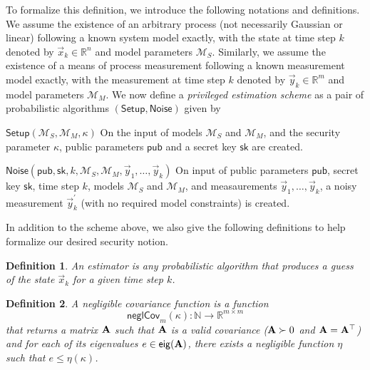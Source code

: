 \documentclass[letterpaper, 10 pt, conference]{ieeeconf}
\newtheorem{definition}{Definition}[section]
\begin{document}
To formalize this definition, we introduce the following notations and definitions. We assume the existence of an arbitrary process (not necessarily Gaussian or linear) following a known system model exactly, with the state at time step $k$ denoted by $\vec{x}_k\in\mathbb{R}^n$ and model parameters $\mathcal{M}_S$. Similarly, we assume the existence of a means of process measurement following a known measurement model exactly, with the measurement at time step $k$ denoted by $\vec{y}_k\in\mathbb{R}^m$ and model parameters $\mathcal{M}_M$. We now define a \textit{privileged estimation scheme} as a pair of probabilistic algorithms $(\mathsf{Setup},\mathsf{Noise})$ given by
\begin{LaTeXdescription}
   \item[$\mathsf{Setup}(\mathcal{M}_S, \mathcal{M}_M, \kappa)$] On the input of models $\mathcal{M}_S$ and $\mathcal{M}_M$, and the security parameter $\kappa$, public parameters $\mathsf{pub}$ and a secret key $\mathsf{sk}$ are created.
   \item[$\mathsf{Noise}(\mathsf{pub}, \mathsf{sk}, k, \mathcal{M}_S, \mathcal{M}_M, \vec{y}_1, \dots, \vec{y}_k)$] On input of public parameters $\mathsf{pub}$, secret key $\mathsf{sk}$, time step $k$, models $\mathcal{M}_S$ and $\mathcal{M}_M$, and measaurements $\vec{y}_1,\dots,\vec{y}_k$, a noisy measurement $\vec{y}^\prime_k$ (with no required model constraints) is created.
\end{LaTeXdescription}
In addition to the scheme above, we also give the following definitions to help formalize our desired security notion.
\begin{definition}\label{def:estimator}
   An \textit{estimator} is any probabilistic algorithm that produces a guess of the state $\vec{x}_k$ for a given time step $k$.
\end{definition}
\begin{definition}
   A \textit{negligible covariance function} is a function 
   \begin{equation}
      \mathsf{neglCov}_m(\kappa):\mathbb{N}\rightarrow \mathbb{R}^{m\times m}
   \end{equation}
   that returns a matrix ${{\mathbf{A}}}$ such that ${{\mathbf{A}}}$ is a valid covariance (${{\mathbf{A}}}\succ 0$ and ${{\mathbf{A}}}={{\mathbf{A}}}^\top$) and for each of its eigenvalues $e\in\mathsf{eig}({{\mathbf{A}}})$, there exists a negligible function \cite[Def. 3.4]{katzIntroductionModernCryptography2008} $\eta$ such that $e\leq\eta(\kappa)$.
\end{definition}
\end{document}
